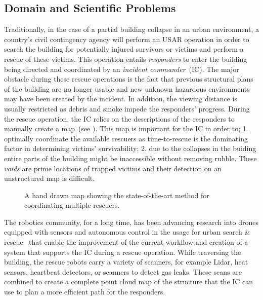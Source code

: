 \subsection{Domain and Scientific Problems} \label{contributions:usar:background}
Traditionally, in the case of a partial building collapse in an urban environment, a country's civil contingency agency will perform an USAR operation in order to search the building for potentially injured survivors or victims and perform a rescue of these victims.  This operation entails \emph{responders} to enter the building being directed and coordinated by an \emph{incident commander}~(IC).  The major obstacle during these rescue operations is the fact that previous structural plans of the building are no longer usable and new unknown hazardous environments may have been created by the incident.  In addition, the viewing distance is usually restricted as debris and smoke impede the responders' progress.  During the rescue operation, the IC relies on the descriptions of the responders to manually create a map~(see ).  This map is important for the IC in order to; 1. optimally coordinate the available rescuers as time-to-rescue is the dominating factor in determining victims' survivability; 2. due to the collapses in the buiding entire parts of the building might be inaccessible without removing rubble.  These \emph{voids} are prime locations of trapped victims and their detection on an unstructured  map is difficult.

\begin{figure}
\centering
{}
\caption{A hand drawn map showing the state-of-the-art method for coordinating multiple rescuers.}
\label{contributions:usar:map:hand}
\end{figure}

The robotics community, for a long time, has been advancing research into drones equipped with sensors and autonomous control in the usage for urban search \& rescue~\cite{liu2013robotic} that enable the improvement of the current workflow and creation of a system that supports the IC during a rescue operation.  While traversing the building, the rescue robots carry a variety of scanners, for example Lidar, heat sensors, heartbeat detectors, or scanners to detect gas leaks.  These scans are combined to create a complete  point cloud map of the structure that the IC can use to plan a more efficient path for the responders.

